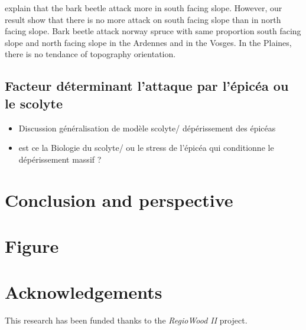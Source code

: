 \documentclass[3p,procedia]{elsarticle}
\begin{document}
explain that the bark beetle attack more in south facing slope.
However, our result show that there is no more attack on south facing slope than in north facing slope.
Bark beetle attack norway spruce with same proportion south facing slope and north facing slope in the Ardennes and in the Vosges.
In the Plaines, there is no tendance of topography orientation.


\subsection{Facteur déterminant l'attaque par l'épicéa ou le scolyte}

\begin{itemize}
	\item Discussion généralisation de modèle scolyte/ dépérissement des épicéas
    \item est ce la Biologie du scolyte/ ou le stress de l'épicéa qui conditionne le dépérissement massif ?
	
\end{itemize}

\section{Conclusion and perspective}

\section{Figure}


	


\section{Acknowledgements}

This research has been funded thanks to the \textit{RegioWood II} project.

%

\end{document}

